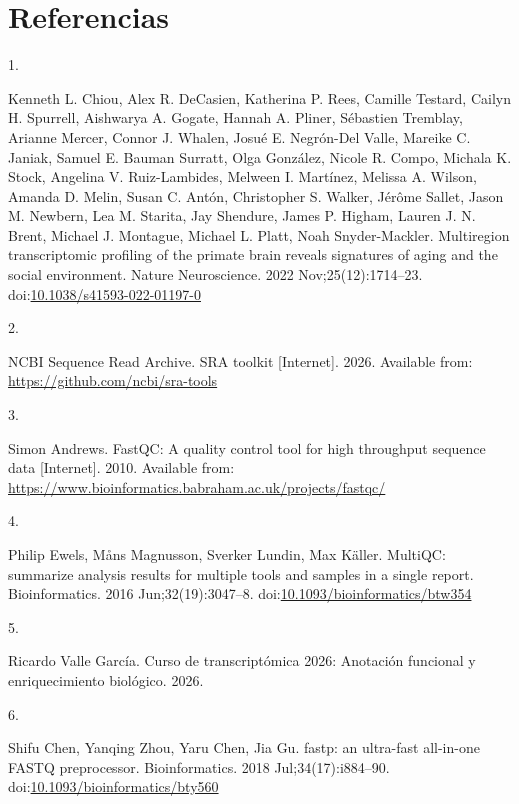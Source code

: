 \documentclass[
  12pt,
  letterpaper,
  DIV=11,
  numbers=noendperiod]{scrartcl}
\newlength{\cslhangindent}
\newlength{\csllabelwidth}
\newenvironment{CSLReferences}[2] %
 {\begin{list}{}{%
  \setlength{\itemindent}{0pt}
  \setlength{\leftmargin}{0pt}
  \setlength{\parsep}{0pt}
  \ifodd #1
   \setlength{\leftmargin}{\cslhangindent}
   \setlength{\itemindent}{-1\cslhangindent}
  \fi
  \setlength{\itemsep}{#2\baselineskip}}}
 {\end{list}}
\newcommand{\CSLLeftMargin}[1]{\parbox[t]{\csllabelwidth}{\strut#1\strut}}
\newcommand{\CSLRightInline}[1]{\parbox[t]{\linewidth - \csllabelwidth}{\strut#1\strut}}
\begin{document}
\newpage

\section{Referencias}\label{referencias}

\label{refs}
\begin{CSLReferences}{0}{1}
\CSLLeftMargin{1. }%
\CSLRightInline{Kenneth L. Chiou, Alex R. DeCasien, Katherina P. Rees,
Camille Testard, Cailyn H. Spurrell, Aishwarya A. Gogate, Hannah A.
Pliner, Sébastien Tremblay, Arianne Mercer, Connor J. Whalen, Josué E.
Negrón-Del Valle, Mareike C. Janiak, Samuel E. Bauman Surratt, Olga
González, Nicole R. Compo, Michala K. Stock, Angelina V. Ruiz-Lambides,
Melween I. Martínez, Melissa A. Wilson, Amanda D. Melin, Susan C. Antón,
Christopher S. Walker, Jérôme Sallet, Jason M. Newbern, Lea M. Starita,
Jay Shendure, James P. Higham, Lauren J. N. Brent, Michael J. Montague,
Michael L. Platt, Noah Snyder-Mackler. {Multiregion transcriptomic
profiling of the primate brain reveals signatures of aging and the
social environment}. Nature Neuroscience. 2022 Nov;25(12):1714--23.
doi:\href{https://doi.org/10.1038/s41593-022-01197-0}{10.1038/s41593-022-01197-0}}

\CSLLeftMargin{2. }%
\CSLRightInline{NCBI Sequence Read Archive. SRA toolkit {[}Internet{]}.
2026. Available from: \url{https://github.com/ncbi/sra-tools}}

\CSLLeftMargin{3. }%
\CSLRightInline{Simon Andrews. FastQC: A quality control tool for high
throughput sequence data {[}Internet{]}. 2010. Available from:
\url{https://www.bioinformatics.babraham.ac.uk/projects/fastqc/}}

\CSLLeftMargin{4. }%
\CSLRightInline{Philip Ewels, Måns Magnusson, Sverker Lundin, Max
Käller. {MultiQC: summarize analysis results for multiple tools and
samples in a single report}. Bioinformatics. 2016 Jun;32(19):3047--8.
doi:\href{https://doi.org/10.1093/bioinformatics/btw354}{10.1093/bioinformatics/btw354}}

\CSLLeftMargin{5. }%
\CSLRightInline{Ricardo Valle García. Curso de transcript{ó}mica 2026:
Anotaci{ó}n funcional y enriquecimiento biol{ó}gico. 2026.}

\CSLLeftMargin{6. }%
\CSLRightInline{Shifu Chen, Yanqing Zhou, Yaru Chen, Jia Gu. {fastp: an
ultra-fast all-in-one FASTQ preprocessor}. Bioinformatics. 2018
Jul;34(17):i884--90.
doi:\href{https://doi.org/10.1093/bioinformatics/bty560}{10.1093/bioinformatics/bty560}}


\end{CSLReferences}
\end{document}
